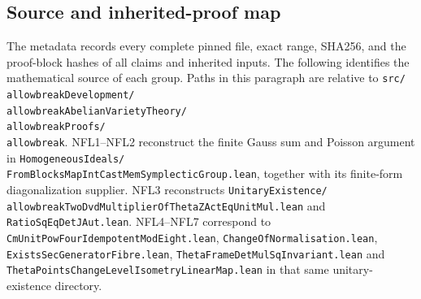 \documentclass[11pt,a4paper]{article}
\numberwithin{equation}{section}
\theoremstyle{remark}\newtheorem{remark}[theorem]{Remark}
\begin{document}
\subsection{Source and inherited-proof map}

\begingroup\raggedright
The metadata records every complete pinned file, exact range,
SHA256, and the proof-block hashes of all claims and inherited
inputs.  The following identifies the mathematical source of
each group.  Paths in this paragraph are relative to
\texttt{src/\\allowbreak{}Development/\\allowbreak{}Abelian\allowbreak{}Variety\allowbreak{}Theory/\\allowbreak{}Proofs/\\allowbreak{}}.
NFL1--NFL2 reconstruct the finite Gauss sum and Poisson argument
in \texttt{Homogeneous\allowbreak Ideals/\allowbreak }\\
\texttt{From\allowbreak{}Blocks\allowbreak{}Map\allowbreak{}Int\allowbreak{}Cast\allowbreak{}Mem\allowbreak{}Symplectic\allowbreak{}Group.lean}, together
with its finite-form diagonalization supplier.  NFL3 reconstructs
\texttt{Unitary\allowbreak{}Existence/\\allowbreak{}Two\allowbreak{}Dvd\allowbreak{}Multiplier\allowbreak{}Of\allowbreak{}Theta\allowbreak{}ZAct\allowbreak{}Eq\allowbreak{}Unit\allowbreak{}Mul.lean}
and \texttt{Ratio\allowbreak Sq\allowbreak Eq\allowbreak Det\allowbreak JAut.\allowbreak lean}.
NFL4--NFL7 correspond to \texttt{Cm\allowbreak{}Unit\allowbreak{}Pow\allowbreak{}Four\allowbreak{}Idempotent\allowbreak{}Mod\allowbreak{}Eight.lean},
\texttt{Change\allowbreak Of\allowbreak Normalisation.\allowbreak lean},
\texttt{Exists\allowbreak Sec\allowbreak Generator\allowbreak Fibre.\allowbreak lean},
\texttt{Theta\allowbreak{}Frame\allowbreak{}Det\allowbreak{}Mul\allowbreak{}Sq\allowbreak{}Invariant.lean} and
\texttt{Theta\allowbreak{}Points\allowbreak{}Change\allowbreak{}Level\allowbreak{}Isometry\allowbreak{}Linear\allowbreak{}Map.lean} in that
same unitary-existence directory.
\end{document}
